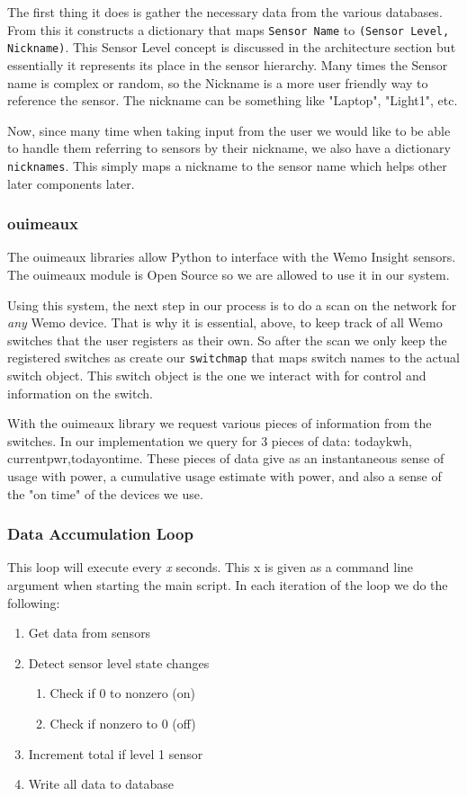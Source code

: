 \documentclass{sig-alternate-05-2015}
\begin{document}
The first thing it does is gather the necessary data from the various databases. From this it constructs a dictionary that maps \texttt{Sensor Name} to \texttt{(Sensor Level, Nickname)}. This Sensor Level concept is discussed in the architecture section but essentially it represents its place in the sensor hierarchy. Many times the Sensor name is complex or random, so the Nickname is a more user friendly way to reference the sensor. The nickname can be something like "Laptop", "Light1", etc. 

Now, since many time when taking input from the user we would like to be able to handle them referring to sensors by their nickname, we also have a dictionary \texttt{nicknames}. This simply maps a nickname to the sensor name which helps other later components later.

\subsubsection{ouimeaux}
The ouimeaux libraries allow Python to interface with the Wemo Insight sensors. The ouimeaux module is Open Source so we are allowed to use it in our system.

Using this system, the next step in our process is to do a scan on the network for \textit{any} Wemo device. That is why it is essential, above, to keep track of all Wemo switches that the user registers as their own. So after the scan we only keep the registered switches as create our \texttt{switchmap} that maps switch names to the actual switch object. This switch object is the one we interact with for control and information on the switch.

With the ouimeaux library we request various pieces of information from the switches. In our implementation we query for 3 pieces of data: todaykwh, currentpwr,todayontime. These pieces of data give as an instantaneous sense of usage with power, a cumulative usage estimate with power, and also a sense of the "on time" of the devices we use.

\subsubsection{Data Accumulation Loop}
This loop will execute every \textit{x} seconds. This x is given as a command line argument when starting the main script. In each iteration of the loop we do the following:
\begin{enumerate}
	\item Get data from sensors
	\item Detect sensor level state changes
	\begin{enumerate}
		\item Check if 0 to nonzero (on)
		\item Check if nonzero to 0 (off)
	\end{enumerate}
	\item Increment total if level 1 sensor
	\item Write all data to database
\end{enumerate}
\end{document}
